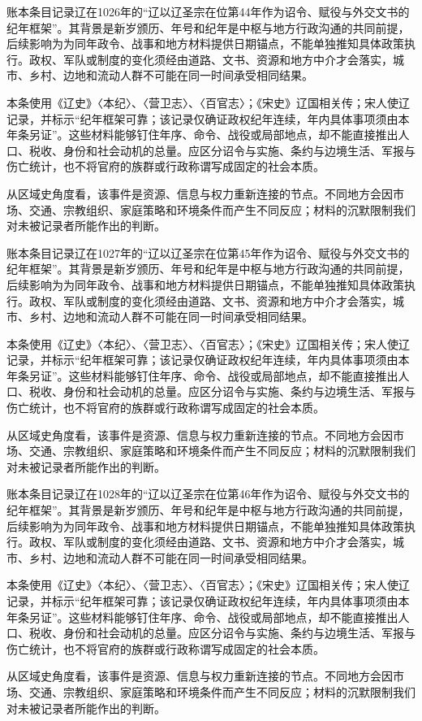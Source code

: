 账本条目记录辽在1026年的“辽以辽圣宗在位第44年作为诏令、赋役与外交文书的纪年框架”。其背景是新岁颁历、年号和纪年是中枢与地方行政沟通的共同前提，后续影响为为同年政令、战事和地方材料提供日期锚点，不能单独推知具体政策执行。政权、军队或制度的变化须经由道路、文书、资源和地方中介才会落实，城市、乡村、边地和流动人群不可能在同一时间承受相同结果。

本条使用《辽史》〈本纪〉、〈营卫志〉、〈百官志〉；《宋史》辽国相关传；宋人使辽记录，并标示“纪年框架可靠；该记录仅确证政权纪年连续，年内具体事项须由本年条另证”。这些材料能够钉住年序、命令、战役或局部地点，却不能直接推出人口、税收、身份和社会动机的总量。应区分诏令与实施、条约与边境生活、军报与伤亡统计，也不将官府的族群或行政称谓写成固定的社会本质。

从区域史角度看，该事件是资源、信息与权力重新连接的节点。不同地方会因市场、交通、宗教组织、家庭策略和环境条件而产生不同反应；材料的沉默限制我们对未被记录者所能作出的判断。

账本条目记录辽在1027年的“辽以辽圣宗在位第45年作为诏令、赋役与外交文书的纪年框架”。其背景是新岁颁历、年号和纪年是中枢与地方行政沟通的共同前提，后续影响为为同年政令、战事和地方材料提供日期锚点，不能单独推知具体政策执行。政权、军队或制度的变化须经由道路、文书、资源和地方中介才会落实，城市、乡村、边地和流动人群不可能在同一时间承受相同结果。

本条使用《辽史》〈本纪〉、〈营卫志〉、〈百官志〉；《宋史》辽国相关传；宋人使辽记录，并标示“纪年框架可靠；该记录仅确证政权纪年连续，年内具体事项须由本年条另证”。这些材料能够钉住年序、命令、战役或局部地点，却不能直接推出人口、税收、身份和社会动机的总量。应区分诏令与实施、条约与边境生活、军报与伤亡统计，也不将官府的族群或行政称谓写成固定的社会本质。

从区域史角度看，该事件是资源、信息与权力重新连接的节点。不同地方会因市场、交通、宗教组织、家庭策略和环境条件而产生不同反应；材料的沉默限制我们对未被记录者所能作出的判断。

账本条目记录辽在1028年的“辽以辽圣宗在位第46年作为诏令、赋役与外交文书的纪年框架”。其背景是新岁颁历、年号和纪年是中枢与地方行政沟通的共同前提，后续影响为为同年政令、战事和地方材料提供日期锚点，不能单独推知具体政策执行。政权、军队或制度的变化须经由道路、文书、资源和地方中介才会落实，城市、乡村、边地和流动人群不可能在同一时间承受相同结果。

本条使用《辽史》〈本纪〉、〈营卫志〉、〈百官志〉；《宋史》辽国相关传；宋人使辽记录，并标示“纪年框架可靠；该记录仅确证政权纪年连续，年内具体事项须由本年条另证”。这些材料能够钉住年序、命令、战役或局部地点，却不能直接推出人口、税收、身份和社会动机的总量。应区分诏令与实施、条约与边境生活、军报与伤亡统计，也不将官府的族群或行政称谓写成固定的社会本质。

从区域史角度看，该事件是资源、信息与权力重新连接的节点。不同地方会因市场、交通、宗教组织、家庭策略和环境条件而产生不同反应；材料的沉默限制我们对未被记录者所能作出的判断。
